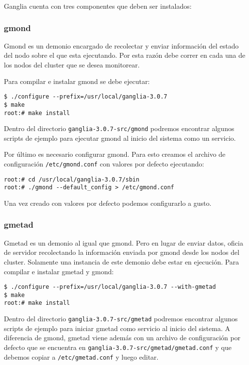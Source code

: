 \documentclass[a4paper,10pt,spanish]{article}
\begin{document}
Ganglia cuenta con tres componentes que deben ser instalados:

\subsubsection{gmond}

Gmond es un demonio encargado de recolectar y enviar informaci\'{o}n del estado del nodo sobre el que esta ejecutando. Por esta raz\'{o}n debe correr en cada una de los nodos del cluster que se desea monitorear.

Para compilar e instalar gmond se debe ejecutar:

\begin{verbatim}
$ ./configure --prefix=/usr/local/ganglia-3.0.7
$ make
root:# make install
\end{verbatim}

Dentro del directorio \mbox{\texttt{ganglia-3.0.7-src/gmond}} podremos encontrar algunos scripts de ejemplo para ejecutar gmond al inicio del sistema como un servicio. 

Por \'{u}ltimo es necesario configurar gmond. Para esto creamos el archivo de configuraci\'{o}n \mbox{\texttt{/etc/gmond.conf}} con valores por defecto ejecutando:

\begin{verbatim}
root:# cd /usr/local/ganglia-3.0.7/sbin
root:# ./gmond --default_config > /etc/gmond.conf
\end{verbatim}

Una vez creado con valores por defecto podemos configurarlo a gusto.

\subsubsection{gmetad}

Gmetad es un demonio al igual que gmond. Pero en lugar de enviar datos, oficia de servidor recolectando la informaci\'{o}n enviada por gmond desde los nodos del cluster. Solamente una instancia de este demonio debe
estar en ejecuci\'{o}n. Para compilar e instalar gmetad y gmond:

\begin{verbatim}
$ ./configure --prefix=/usr/local/ganglia-3.0.7 --with-gmetad 
$ make
root:# make install
\end{verbatim}

Dentro del directorio \mbox{\texttt{ganglia-3.0.7-src/gmetad}} podremos encontrar algunos scripts de ejemplo para iniciar gmetad como servicio al inicio del sistema. A diferencia de gmond, gmetad viene adem\'{a}s con un archivo de configuraci\'{o}n por defecto que se encuentra en \mbox{\texttt{ganglia-3.0.7-src/gmetad/gmetad.conf}} y que debemos copiar a \mbox{\texttt{/etc/gmetad.conf}} y luego editar.
\end{document}
